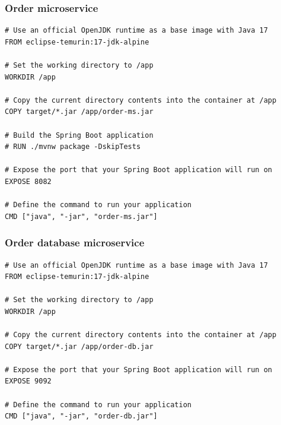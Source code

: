 \subsubsection*{Order microservice}
\begin{lstlisting}[language=docker]
# Use an official OpenJDK runtime as a base image with Java 17
FROM eclipse-temurin:17-jdk-alpine

# Set the working directory to /app
WORKDIR /app

# Copy the current directory contents into the container at /app
COPY target/*.jar /app/order-ms.jar

# Build the Spring Boot application
# RUN ./mvnw package -DskipTests

# Expose the port that your Spring Boot application will run on
EXPOSE 8082

# Define the command to run your application
CMD ["java", "-jar", "order-ms.jar"]
\end{lstlisting}

\subsubsection*{Order database microservice}
\begin{lstlisting}[language=docker]
# Use an official OpenJDK runtime as a base image with Java 17
FROM eclipse-temurin:17-jdk-alpine

# Set the working directory to /app
WORKDIR /app

# Copy the current directory contents into the container at /app
COPY target/*.jar /app/order-db.jar

# Expose the port that your Spring Boot application will run on
EXPOSE 9092

# Define the command to run your application
CMD ["java", "-jar", "order-db.jar"]
\end{lstlisting}

